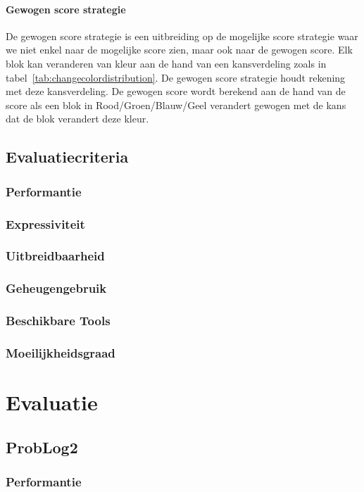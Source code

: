 \documentclass[12pt,a4paper,oneside]{book}
\theoremstyle{definition}
\begin{document}
\subsubsection{Gewogen score strategie}
De gewogen score strategie is een uitbreiding op de mogelijke score strategie waar we niet enkel naar de mogelijke score zien, maar ook naar de gewogen score. Elk blok kan veranderen van kleur aan de hand van een kansverdeling zoals in tabel~\ref{tab:changecolordistribution}. De gewogen score strategie houdt rekening met deze kansverdeling. De gewogen score wordt berekend aan de hand van de score als een blok in Rood/Groen/Blauw/Geel verandert gewogen met de kans dat de blok verandert deze kleur.
\section{Evaluatiecriteria}
\label{sec:uitwerkingEvaluatiecriteria}
\subsection{Performantie}
\subsection{Expressiviteit}
\subsection{Uitbreidbaarheid}
\subsection{Geheugengebruik}
\subsection{Beschikbare Tools}
\subsection{Moeilijkheidsgraad}

\chapter{Evaluatie}
\label{ch:evaluatie}
\section{ProbLog2}
\label{sec:evaluatieProbLog2}
\subsection{Performantie}
\end{document}
